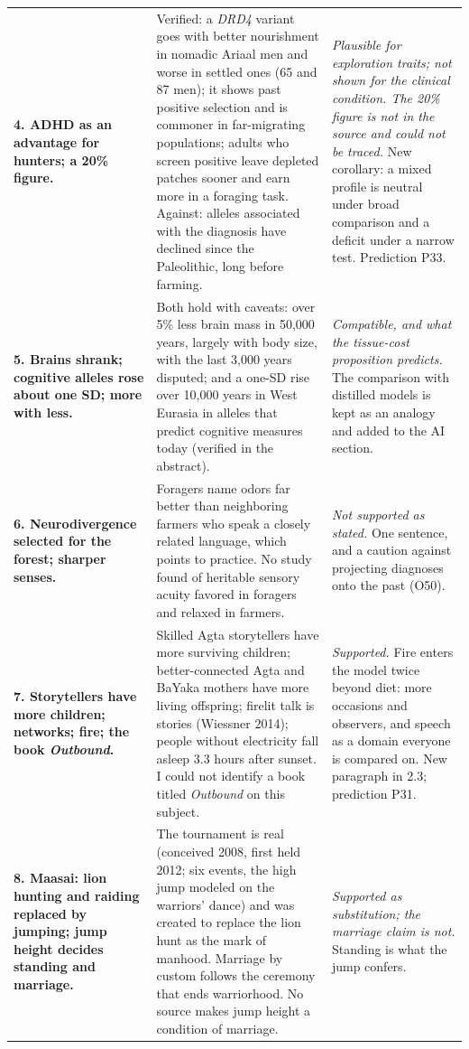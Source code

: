 \documentclass[10pt,letterpaper]{extarticle}
\newcommand{\lab}[1]{\textbf{#1}}
\begin{document}
{\begin{longtable}{@{}P{0.20\textwidth}P{0.42\textwidth}P{0.31\textwidth}@{}}
\lab{4. ADHD as an advantage for hunters; a 20\% figure.} & Verified: a \textit{DRD4} variant goes with better nourishment in nomadic Ariaal men and worse in settled ones (65 and 87 men); it shows past positive selection and is commoner in far-migrating populations; adults who screen positive leave depleted patches sooner and earn more in a foraging task. Against: alleles associated with the diagnosis have declined since the Paleolithic, long before farming. & \emph{Plausible for exploration traits; not shown for the clinical condition. The 20\% figure is not in the source and could not be traced.} New corollary: a mixed profile is neutral under broad comparison and a deficit under a narrow test. Prediction P33.\\
\lab{5. Brains shrank; cognitive alleles rose about one SD; more with less.} & Both hold with caveats: over 5\% less brain mass in 50,000 years, largely with body size, with the last 3,000 years disputed; and a one-SD rise over 10,000 years in West Eurasia in alleles that predict cognitive measures today (verified in the abstract). & \emph{Compatible, and what the tissue-cost proposition predicts.} The comparison with distilled models is kept as an analogy and added to the AI section.\\
\lab{6. Neurodivergence selected for the forest; sharper senses.} & Foragers name odors far better than neighboring farmers who speak a closely related language, which points to practice. No study found of heritable sensory acuity favored in foragers and relaxed in farmers. & \emph{Not supported as stated.} One sentence, and a caution against projecting diagnoses onto the past (O50).\\
\lab{7. Storytellers have more children; networks; fire; the book \emph{Outbound}.} & Skilled Agta storytellers have more surviving children; better-connected Agta and BaYaka mothers have more living offspring; firelit talk is stories (Wiessner 2014); people without electricity fall asleep 3.3 hours after sunset. I could not identify a book titled \emph{Outbound} on this subject. & \emph{Supported.} Fire enters the model twice beyond diet: more occasions and observers, and speech as a domain everyone is compared on. New paragraph in 2.3; prediction P31.\\
\lab{8. Maasai: lion hunting and raiding replaced by jumping; jump height decides standing and marriage.} & The tournament is real (conceived 2008, first held 2012; six events, the high jump modeled on the warriors' dance) and was created to replace the lion hunt as the mark of manhood. Marriage by custom follows the ceremony that ends warriorhood. No source makes jump height a condition of marriage. & \emph{Supported as substitution; the marriage claim is not.} Standing is what the jump confers.\\

\end{longtable}}
\end{document}
